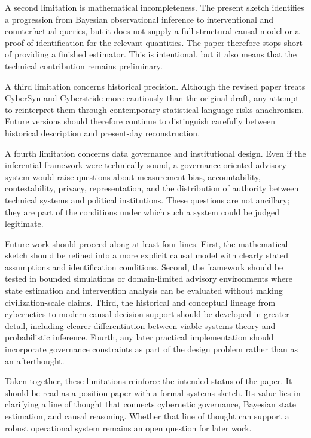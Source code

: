 \documentclass[11pt]{article}
\begin{document}
A second limitation is mathematical incompleteness. The present sketch identifies a progression from Bayesian observational inference to interventional and counterfactual queries, but it does not supply a full structural causal model or a proof of identification for the relevant quantities. The paper therefore stops short of providing a finished estimator. This is intentional, but it also means that the technical contribution remains preliminary.

A third limitation concerns historical precision. Although the revised paper treats CyberSyn and Cyberstride more cautiously than the original draft, any attempt to reinterpret them through contemporary statistical language risks anachronism. Future versions should therefore continue to distinguish carefully between historical description and present-day reconstruction.

A fourth limitation concerns data governance and institutional design. Even if the inferential framework were technically sound, a governance-oriented advisory system would raise questions about measurement bias, accountability, contestability, privacy, representation, and the distribution of authority between technical systems and political institutions. These questions are not ancillary; they are part of the conditions under which such a system could be judged legitimate.

Future work should proceed along at least four lines. First, the mathematical sketch should be refined into a more explicit causal model with clearly stated assumptions and identification conditions. Second, the framework should be tested in bounded simulations or domain-limited advisory environments where state estimation and intervention analysis can be evaluated without making civilization-scale claims. Third, the historical and conceptual lineage from cybernetics to modern causal decision support should be developed in greater detail, including clearer differentiation between viable systems theory and probabilistic inference. Fourth, any later practical implementation should incorporate governance constraints as part of the design problem rather than as an afterthought.

Taken together, these limitations reinforce the intended status of the paper. It should be read as a position paper with a formal systems sketch. Its value lies in clarifying a line of thought that connects cybernetic governance, Bayesian state estimation, and causal reasoning. Whether that line of thought can support a robust operational system remains an open question for later work.
\end{document}
